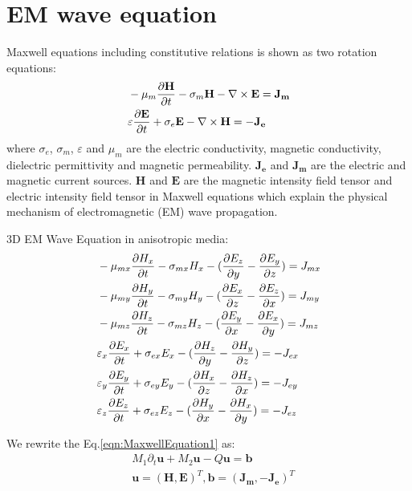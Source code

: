 \documentclass[pdftex,a4paper,parskip,listof=totoc,bibliography=totoc,onehalfspacing,12pt]{scrreprt}
\begin{document}
\section{EM wave equation}
\par Maxwell equations including constitutive relations is shown as two rotation equations: \\
\begin{equation}
\begin{align*}
\label{eqn:MaxwellEquation}
&-\mu_{m} \pdv{ \mathbf{H}}{t} - \sigma_{m}\mathbf{H} - \nabla \times \mathbf{E} =  \mathbf{J_{m}} \\
&\varepsilon\pdv{ \mathbf{E}}{t} + \sigma_{e}\mathbf{E} -\nabla \times \mathbf{H} =  - \mathbf{J_{e}}
\end{align*}
\end{equation}
where $\sigma_{e}$, $\sigma_{m}$, $\varepsilon$ and $\mu_{m}$ are the electric conductivity, magnetic conductivity, dielectric permittivity and magnetic permeability. $\mathbf{J_{e}}$ and $\mathbf{J_{m}}$ are the electric and magnetic current sources. $\mathbf{H}$ and $\mathbf{E}$ are the magnetic intensity field tensor and electric intensity field tensor in Maxwell equations which explain the physical mechanism of electromagnetic (EM) wave propagation.\\
\par 3D EM Wave Equation in anisotropic media:
\begin{equation}
\begin{align*}
\label{eqn:MaxwellEquation1}
&-\mu_{mx} \pdv{H_{x}}{t} - \sigma_{mx} H_{x} - (\pdv{E_z}{y} - \pdv{E_y}{z}) = J_{mx}\\
&-\mu_{my} \pdv{H_{y}}{t} - \sigma_{my} H_{y} - (\pdv{E_x}{z} - \pdv{E_z}{x}) = J_{my}\\
&-\mu_{mz} \pdv{H_{z}}{t} - \sigma_{mz} H_{z} - (\pdv{E_y}{x} - \pdv{E_x}{y}) = J_{mz}\\
&\varepsilon_{x} \pdv{E_{x}}{t} + \sigma_{ex} E_{x} - (\pdv{H_z}{y} - \pdv{H_y}{z}) = -J_{ex}\\
&\varepsilon_{y} \pdv{E_{y}}{t} + \sigma_{ey} E_{y} - (\pdv{H_x}{z} - \pdv{H_z}{x}) = -J_{ey}\\
&\varepsilon_{z} \pdv{E_{z}}{t} + \sigma_{ez} E_{z} - (\pdv{H_y}{x} - \pdv{H_x}{y}) = -J_{ez}
\end{align*}
\end{equation}
\par We rewrite the Eq.\ref{eqn:MaxwellEquation1} as:
\begin{equation}
\begin{align*}
\label{eqn:MaxwellEquationMatrix}
&M_1 \partial_{t} \mathbf{u} + M_2 \mathbf{u} - Q\mathbf{u} = \mathbf{b} \\
&\mathbf{u} = (\mathbf{H}, \mathbf{E})^T, \mathbf{b} = (\mathbf{J_{m}}, -\mathbf{J_{e}})^T \\
\end{align*}
\end{equation}
\end{document}
